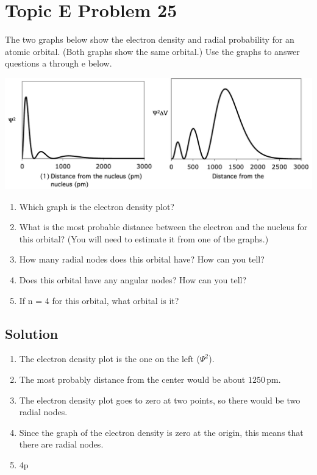 \documentclass[10pt]{article}
\begin{document}
    \section{Topic E Problem 25}
        The two graphs below show the electron density and radial probability for an atomic orbital.
        (Both graphs show the same orbital.) 
        Use the graphs to answer questions a through e below.
        \begin{center}
            \includegraphics[width=\textwidth]{img-E25.png}
        \end{center}

        \begin{enumerate}[label=\alph*)]
            \item   Which graph is the electron density plot?
            \item   What is the most probable distance between the electron and the nucleus for this orbital? (You will need to estimate it from one of the graphs.)
            \item   How many radial nodes does this orbital have? How can you tell?
            \item   Does this orbital have any angular nodes? How can you tell?
            \item   If n = 4 for this orbital, what orbital is it?
        \end{enumerate}

        \subsection{Solution}
            \begin{enumerate}[label=\alph*/]
                \item   The electron density plot is the one on the left ($\Psi^2$).
                \item   The most probably distance from the center would be about $1250\,\unit{\pico\meter}$.
                \item   The electron density plot goes to zero at two points, so there would be two radial nodes.
                \item   Since the graph of the electron density is zero at the origin, this means that there are radial nodes.
                \item   4p
            \end{enumerate}
\end{document}

